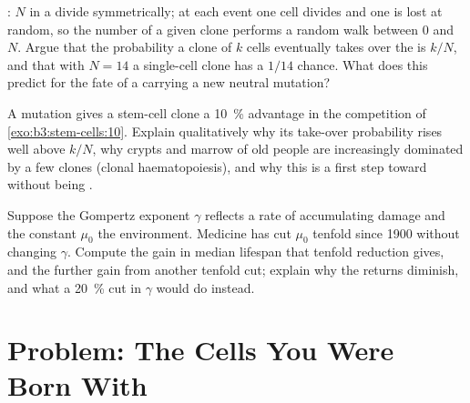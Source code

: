 \begin{exercise}[$\star\star\star$]\label{exo:b3:stem-cells:10}
: $N$  in a  divide symmetrically; at each
event one cell divides and one is lost at random, so the number of a
given clone performs a random walk between $0$ and $N$. Argue that the
probability a clone of $k$ cells eventually takes over the  is
$k/N$, and that with $N = 14$ a single-cell clone has a $1/14$ chance.
What does this predict for the fate of a  carrying a new
neutral mutation?
\end{exercise}

\begin{exercise}[$\star\star\star$]\label{exo:b3:stem-cells:11}
A mutation gives a stem-cell clone a \qty{10}{\%} advantage in the
competition of \cref{exo:b3:stem-cells:10}. Explain qualitatively why
its take-over probability rises well above $k/N$, why crypts and marrow
of old people are increasingly dominated by a few clones (clonal
haematopoiesis), and why this is a first step toward  without
being .
\end{exercise}

\begin{exercise}[$\star\star\star$]\label{exo:b3:stem-cells:12}
Suppose the Gompertz exponent $\gamma$ reflects a rate of accumulating
damage and the constant $\mu_{0}$ the environment. Medicine has cut
$\mu_{0}$ tenfold since 1900 without changing $\gamma$. Compute the gain
in median lifespan that tenfold reduction gives, and the further gain
from another tenfold cut; explain why the returns diminish, and what a
\qty{20}{\%} cut in $\gamma$ would do instead.
\end{exercise}

\section{Problem: The Cells You Were Born With}

